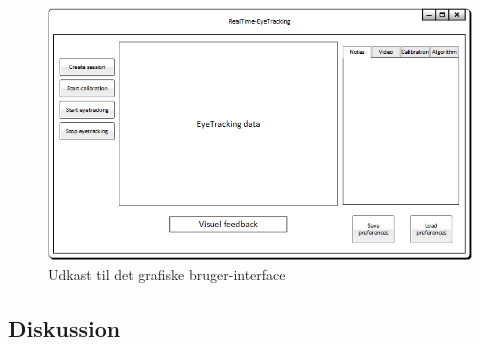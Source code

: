 \documentclass[rapport.tex]{subfiles}
\begin{document}
	\begin{figure}
		\centering
		\includegraphics[width=0.9\linewidth]{FrameworkUdkastSimpel}
		\caption[Udkast til GUI]{Udkast til det grafiske bruger-interface}
		\label{fig:FrameworkUdkastSimpel}
	\end{figure}
	
	
	
	\subsection{Diskussion}
\end{document}

